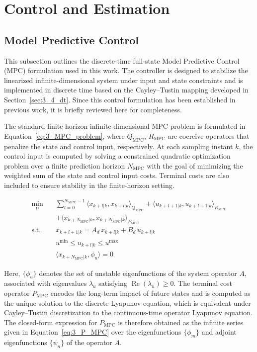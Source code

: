 \section{Control and Estimation} \label{sec:3_control}

\subsection{Model Predictive Control} \label{sec:3_mpc}

This subsection outlines the discrete-time full-state Model Predictive Control (MPC) formulation used in this work. The controller is designed to stabilize the linearized infinite-dimensional system under input and state constraints and is implemented in discrete time based on the Cayley--Tustin mapping developed in Section~\ref{sec:3_4_dt}. Since this control formulation has been established in previous work\autocite{Moadeli2025Model}, it is briefly reviewed here for completeness.

The standard finite-horizon infinite-dimensional MPC problem is formulated in Equation~\ref{eq:3_MPC_problem}, where $Q_{\mathrm{MPC}}$, $R_{\mathrm{MPC}}$ are coercive operators that penalize the state and control input, respectively. At each sampling instant $k$, the control input is computed by solving a constrained quadratic optimization problem over a finite prediction horizon $N_{\mathrm{MPC}}$ with the goal of minimizing the weighted sum of the state and control input costs. Terminal costs are also included to ensure stability in the finite-horizon setting.

\begin{equation} \label{eq:3_MPC_problem}
\begin{aligned}
\min_{U} \quad & \sum_{l=0}^{N_{\mathrm{MPC}} - 1} \langle x_{k+l|k}, x_{k+l|k} \rangle_{Q_{\mathrm{MPC}}} + \langle u_{k+l+1|k}, u_{k+l+1|k} \rangle_{R_{\mathrm{MPC}}} \\
&+ \langle x_{k+N_{\mathrm{MPC}}|k}, x_{k+N_{\mathrm{MPC}}|k} \rangle_{P_{\mathrm{MPC}}} \\
\text{s.t.} \quad & x_{k+l+1|k} = A_d\, x_{k+l|k} + B_d\, u_{k+l|k} \\
& u^{\min} \leq u_{k+l|k} \leq u^{\max} \\
& \langle x_{k+N_{\mathrm{MPC}}|k}, \phi_u \rangle = 0
\end{aligned}
\end{equation}

Here, $\{\phi_u\}$ denotes the set of unstable eigenfunctions of the system operator $A$, associated with eigenvalues $\lambda_u$ satisfying $\operatorname{Re}(\lambda_u) \geq 0$. The terminal cost operator $P_{\mathrm{MPC}}$ encodes the long-term impact of future states and is computed as the unique solution to the discrete Lyapunov equation, which is equivalent under Cayley--Tustin discretization to the continuous-time operator Lyapunov equation\autocite{Curtain2020Introduction,Khatibi2021Model}. The closed-form expression for $P_{\mathrm{MPC}}$ is therefore obtained as the infinite series given in Equation~\ref{eq:3_P_MPC} over the eigenfunctions $\{\phi_m\}$ and adjoint eigenfunctions $\{\psi_n\}$ of the operator $A$.

